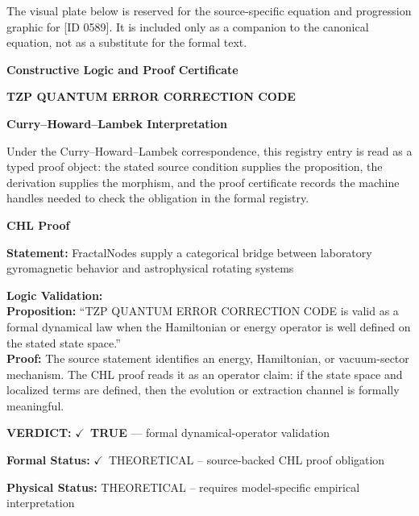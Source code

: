 \begingroup\footnotesize\sloppy
The visual plate below is reserved for the source-specific equation and progression graphic for [ID 0589]. It is included only as a companion to the canonical equation, not as a substitute for the formal text.
\par\endgroup
\ifTZPDarkEdition
{}
\fi

\clearpage
\begingroup\tzpsupportsetup
\noindent\textbf{\fontsize{10.8pt}{12.8pt}\selectfont [ID 0589] Constructive Logic and Proof Certificate}\par
\noindent\textbf{\fontsize{10pt}{12pt}\selectfont TZP QUANTUM ERROR CORRECTION CODE}\par
\vspace{0.45em}
\begingroup
\footnotesize
\setlength{\parskip}{0.22em}
\setlength{\parindent}{0pt}
\noindent\textbf{Curry--Howard--Lambek Interpretation}\par
Under the Curry--Howard--Lambek correspondence, this registry entry is read as a typed proof
object: the stated source condition supplies the proposition, the derivation supplies the
morphism, and the proof certificate records the machine handles needed to check the obligation
in the formal registry.

\vspace{0.45em}
\noindent\textbf{CHL Proof}\par
\textbf{Statement:} FractalNodes supply a categorical bridge between laboratory gyromagnetic behavior and
astrophysical rotating systems

\textbf{Logic Validation:}\\
\textbf{Proposition:} ``TZP QUANTUM ERROR CORRECTION CODE is valid as a formal dynamical law when the
Hamiltonian or energy operator is well defined on the stated state space.''\\
\textbf{Proof:} The source statement identifies an energy, Hamiltonian, or vacuum-sector mechanism. The
CHL proof reads it as an operator claim: if the state space and localized terms are
defined, then the evolution or extraction channel is formally meaningful.

\textbf{VERDICT:} \ensuremath{\checkmark}\ \textbf{TRUE} --- formal dynamical-operator validation

\textbf{Formal Status:} \ensuremath{\checkmark}\ THEORETICAL -- source-backed CHL proof obligation

\textbf{Physical Status:} THEORETICAL -- requires model-specific empirical interpretation
\par\vspace{0.45em}
\par
\ifTZPDarkEdition
{}
\fi
\endgroup
\endgroup

